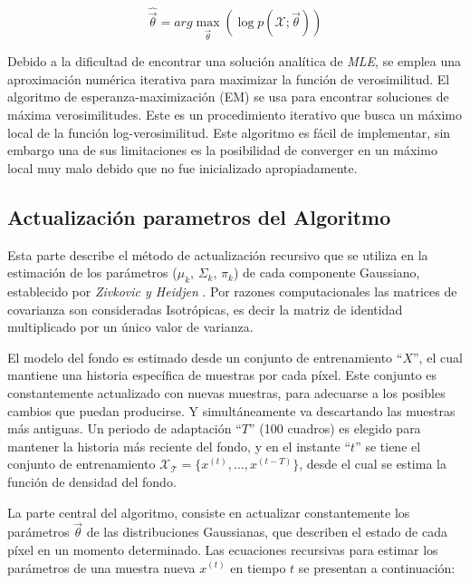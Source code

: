 \begin{equation} \label{eq:maxima_verosimilutd}
\hat{\vec{\theta}} = arg \max_{\vec{\theta}}  (\log p(\mathcal{X};\vec{\theta}))
\end{equation}

 
Debido a la dificultad de encontrar una solución analítica de \textit{MLE}, se emplea una aproximación numérica iterativa para maximizar la función de verosimilitud.  El algoritmo de esperanza-maximización (EM) \cite{dempster_maximum_1977} se usa para encontrar soluciones de máxima verosimilitudes. Este es un procedimiento iterativo que busca un máximo local de la función log-verosimilitud. Este algoritmo es fácil de implementar, sin embargo una de sus limitaciones es la posibilidad de converger en un máximo local muy malo debido que no fue inicializado apropiadamente.


\subsection{Actualización parametros del Algoritmo}

Esta parte describe el método de actualización recursivo que se utiliza en la estimación de los parámetros ($\mu_k$, $\Sigma_k$, $\pi_k$) de cada componente Gaussiano, establecido por \textit{Zivkovic y Heidjen} \cite{zivkovic_efficient_2006}. Por razones computacionales las matrices de covarianza son consideradas Isotrópicas, es decir la matriz de identidad multiplicado por un único valor de varianza.

El modelo del fondo es estimado desde un conjunto de entrenamiento ``$X$'', el cual mantiene una historia específica de muestras por cada píxel. Este conjunto es constantemente actualizado con nuevas muestras, para adecuarse a los posibles cambios que puedan producirse. Y simultáneamente va descartando las muestras más antiguas. Un periodo de adaptación ``$T$'' (100 cuadros) es elegido para mantener la historia más reciente del fondo, y en el instante ``$t$'' se tiene el conjunto de entrenamiento $\mathcal{X_T} = \{x^{(t)}, ..., x^{(t-T)}\}$, desde el cual se estima la función de densidad del fondo.

La parte central del algoritmo, consiste en actualizar constantemente los parámetros $\vec{\theta}$ de las distribuciones Gaussianas, que describen el estado de cada píxel en un momento determinado. Las ecuaciones recursivas para estimar los parámetros de una muestra nueva $x^{(t)}$ en tiempo $t$ se presentan a continuación:


